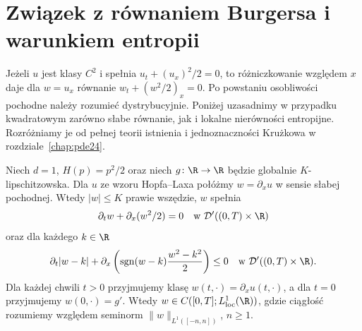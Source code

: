 \section{Związek z równaniem Burgersa i warunkiem entropii}
Jeżeli $u$ jest klasy $C^2$ i spełnia
$u_t+(u_x)^2/2=0$, to różniczkowanie względem
$x$ daje dla $w=u_x$ równanie
$w_t+(w^2/2)_x=0$. Po powstaniu osobliwości
pochodne należy rozumieć dystrybucyjnie.
Poniżej uzasadnimy w przypadku kwadratowym
zarówno słabe równanie, jak i lokalne
nierówności entropijne. Rozróżniamy je od
pełnej teorii istnienia i jednoznaczności
Krużkowa w rozdziale~\ref{chap:pde24}.

\begin{twierdzenie}
Niech $d=1$, $H(p)=p^2/2$ oraz niech
$g\colon\R\to\R$ będzie globalnie $K$-lipschitzowska.
Dla $u$ ze wzoru Hopfa--Laxa połóżmy $w=\partial_xu$
w sensie słabej pochodnej. Wtedy $|w|\le K$
prawie wszędzie, $w$ spełnia
\[
 \partial_tw+\partial_x(w^2/2)=0
 \quad\text{w }\mathcal D'((0,T)\times\R)
\]
oraz dla każdego $k\in\R$
\[
 \partial_t|w-k|+\partial_x\left(
  \operatorname{sgn}(w-k)\frac{w^2-k^2}{2}\right)\le0
 \quad\text{w }\mathcal D'((0,T)\times\R).
\]
Dla każdej chwili $t>0$ przyjmujemy klasę
$w(t,\cdot)=\partial_xu(t,\cdot)$, a dla $t=0$
przyjmujemy $w(0,\cdot)=g'$.
Wtedy $w\in C([0,T];L^1_{\mathrm{loc}}(\R))$,
gdzie ciągłość rozumiemy względem seminorm
$\|w\|_{L^1([-n,n])}$, $n\ge1$.
\end{twierdzenie}
